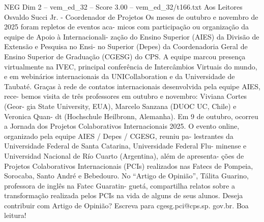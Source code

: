 \begin{textsample}{NEG Dim 2 – vem\_ed\_32 – Score 3.00 – vem\_ed\_32/t166.txt}  \label{ex:f2_neg_141}
Aos Leitores Osvaldo Succi Jr. - Coordenador de Projetos Os meses de outubro e novembro de 2025 foram repletos de eventos aca- micos com participação ou organização da equipe de Apoio à Internacionali- zação do Ensino Superior (AIES) da Divisão de Extensão e Pesquisa no Ensi- no Superior (Depes) da Coordenadoria Geral de Ensino Superior de Graduação (CGESG) do CPS.
A equipe marcou presença virtualmente na IVEC, principal conferência de Intercâmbios Virtuais do mundo, e em webinários internacionais da UNICollaboration e da Universidade de Taubaté.
Graças à rede de contatos internacionais desenvolvida pela equipe AIES, rece- bemos visita de três professores em outubro e novembro: Viviana Cortes (Geor- gia State University, EUA), Marcelo Sanzana (DUOC UC, Chile) e Veronica Quan- dt (Hochschule Heilbronn, Alemanha).
Em 9 de outubro, ocorreu a Jornada dos Projetos Colaborativos Internacionais 2025.
O evento online, organizado pela equipe AIES / Depes / CGESG, reuniu pa- lestrantes da Universidade Federal de Santa Catarina, Universidade Federal Flu- minense e Universidad Nacional de Río Cuarto (Argentina), além de apresenta- ções de Projetos Colaborativos Internacionais (PCIs) realizados nas Fatecs de Pompeia, Sorocaba, Santo André e Bebedouro.
No “Artigo de Opinião”, Tálita Guarino, professora de inglês na Fatec Guaratin- guetá, compartilha relatos sobre a transformação realizada pelos PCIs na vida de alguns de seus alunos.
Deseja contribuir com Artigo de Opinião?
Escreva para cgesg.pci@cps.sp. gov.br.
Boa leitura!

\end{textsample}
